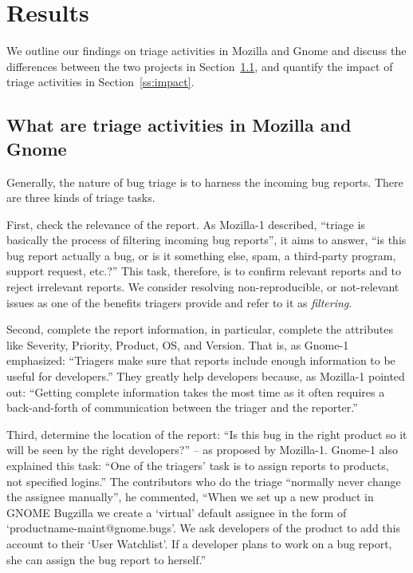 \documentclass[conference]{IEEEtran}
\begin{document}
\section{Results}\label{s:result}
We outline our findings on triage activities in Mozilla and Gnome
and discuss the differences between the two projects in
Section~\ref{ss:what}, and quantify
the impact of triage activities in Section~\ref{ss:impact}.

\subsection{What are triage activities in Mozilla and Gnome}\label{ss:what}
Generally, the nature of bug triage is to harness
the incoming bug reports. There are three kinds of triage tasks.

First, check the relevance of the report. As Mozilla-1 described,
``triage is basically the process of filtering incoming bug
  reports'', it aims to answer, ``is this bug report actually a
  bug, or is it something else, spam, a third-party program, support
  request, etc.?'' This task, therefore, is to confirm relevant
reports and to reject irrelevant reports.  We consider resolving
non-reproducible, or not-relevant issues as one of the benefits
triagers provide and refer to it as {\em filtering}.

Second, complete the report information, in particular, complete the attributes
like Severity, Priority, Product, OS, and Version. That is, as Gnome-1
emphasized: ``Triagers make sure that reports include enough
information to be useful for developers.''
They greatly help developers because, as Mozilla-1 pointed out:
``Getting complete information takes the most time as it often requires a
  back-and-forth of communication between the triager and the reporter.''

Third, determine the location of the report: ``Is this bug in
  the right product so it will be seen by the right developers?''
-- as proposed by Mozilla-1.  Gnome-1 also explained this task:
``One of the triagers' task is to assign reports to products,
  not specified logins.''  The contributors who do the triage
``normally never change the assignee manually'', he commented,
``When we set up a new product in GNOME Bugzilla we create a
  `virtual' default assignee in the form of
  `productname-maint@gnome.bugs'. We ask developers of the product
  to add this account to their `User Watchlist'. If a developer
  plans to work on a bug report, she can assign the bug report to
  herself.''
\end{document}
